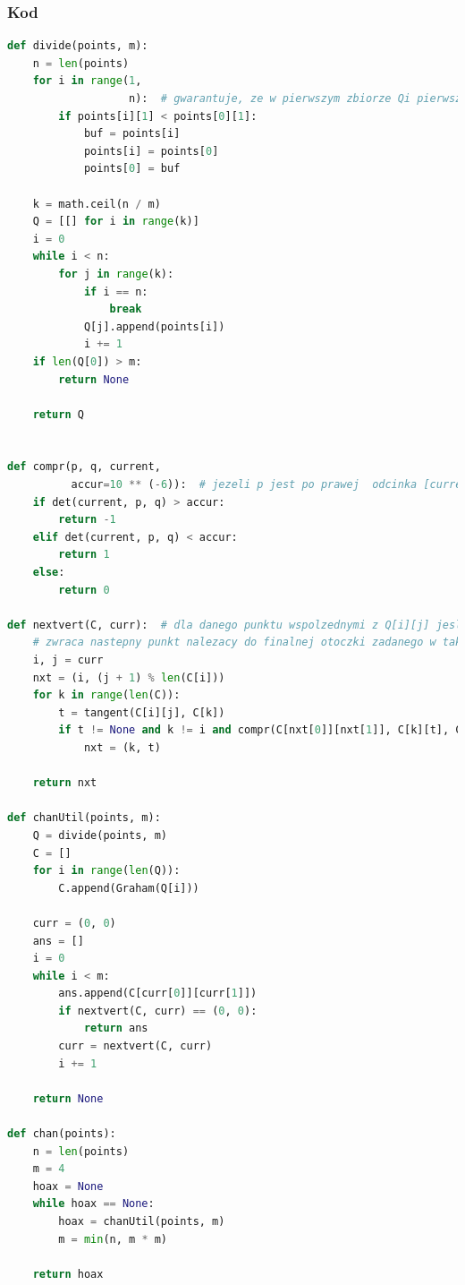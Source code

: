 \documentclass[11pt]{article}
\theoremstyle{remark} \newtheorem{definition}{def.}
\theoremstyle{definition} \newtheorem{twierdzenie}{tw.}
\begin{document}
    \subsubsection{Kod}
\begin{lstlisting}[language=Python]
def divide(points, m):
    n = len(points)
    for i in range(1,
                   n):  # gwarantuje, ze w pierwszym zbiorze Qi pierwszy element jest najnizszy, czyli nalezy do otoczki ostatecznej
        if points[i][1] < points[0][1]:
            buf = points[i]
            points[i] = points[0]
            points[0] = buf

    k = math.ceil(n / m)
    Q = [[] for i in range(k)]
    i = 0
    while i < n:
        for j in range(k):
            if i == n:
                break
            Q[j].append(points[i])
            i += 1
    if len(Q[0]) > m:
        return None

    return Q


def compr(p, q, current,
          accur=10 ** (-6)):  # jezeli p jest po prawej  odcinka [current,q] - jest 'wiekszy', to zwracamy 1
    if det(current, p, q) > accur:
        return -1
    elif det(current, p, q) < accur:
        return 1
    else:
        return 0

def nextvert(C, curr):  # dla danego punktu wspolzednymi z Q[i][j] jesli jest to punkt nalezacy do finalnej otoczki, to
    # zwraca nastepny punkt nalezacy do finalnej otoczki zadanego w takich samych wspolzednych Q[nxt[0]][nxt[1]]
    i, j = curr
    nxt = (i, (j + 1) % len(C[i]))
    for k in range(len(C)):
        t = tangent(C[i][j], C[k])
        if t != None and k != i and compr(C[nxt[0]][nxt[1]], C[k][t], C[i][j]) > 0 and (k, t) != (curr):
            nxt = (k, t)

    return nxt

def chanUtil(points, m):
    Q = divide(points, m)
    C = []
    for i in range(len(Q)):
        C.append(Graham(Q[i]))

    curr = (0, 0)
    ans = []
    i = 0
    while i < m:
        ans.append(C[curr[0]][curr[1]])
        if nextvert(C, curr) == (0, 0):
            return ans
        curr = nextvert(C, curr)
        i += 1

    return None

def chan(points):
    n = len(points)
    m = 4
    hoax = None
    while hoax == None:
        hoax = chanUtil(points, m)
        m = min(n, m * m)

    return hoax
\end{lstlisting}
    
\end{document}
